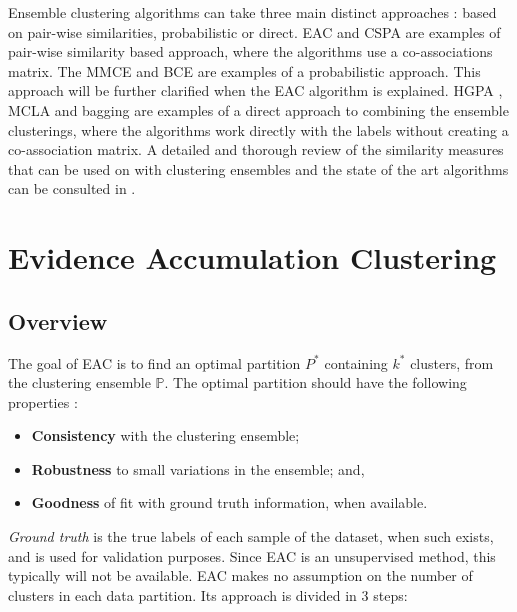 Ensemble clustering algorithms can take three main distinct approaches \cite{Aggarwal2014}: based on pair-wise similarities, probabilistic or direct.
EAC \cite{Fred2005} and CSPA \cite{Strehl2002} are examples of pair-wise similarity based approach, where the algorithms use a co-associations matrix.
The MMCE \cite{topchy2004mixture} and BCE \cite{wang2011bayesian} are examples of a probabilistic approach.
This approach will be further clarified when the EAC algorithm is explained.
HGPA \cite{Strehl2002}, MCLA \cite{Strehl2002} and bagging \cite{Dudoit2003} are examples of a direct approach to combining the ensemble clusterings, where the algorithms work directly with the labels without creating a co-association matrix.
A detailed and thorough review of the similarity measures that can be used on with clustering ensembles and the state of the art algorithms can be consulted in \cite{Aggarwal2014}.


\section{Evidence Accumulation Clustering}
\label{sec:eac}

\subsection{Overview}

The goal of EAC is to find an optimal partition $P^*$ containing $k^*$ clusters, from the clustering ensemble $\mathbb{P}$. The optimal partition should have the following properties \cite{Fred2005}:

\begin{itemize}
    \item \textbf{Consistency} with the clustering ensemble;
    \item \textbf{Robustness} to small variations in the ensemble; and,
    \item \textbf{Goodness} of fit with ground truth information, when available.
\end{itemize}

\emph{Ground truth} is the true labels of each sample of the dataset, when such exists, and is used for validation purposes.
Since EAC is an unsupervised method, this typically will not be available.
EAC makes no assumption on the number of clusters in each data partition.
Its approach is divided in 3 steps:

